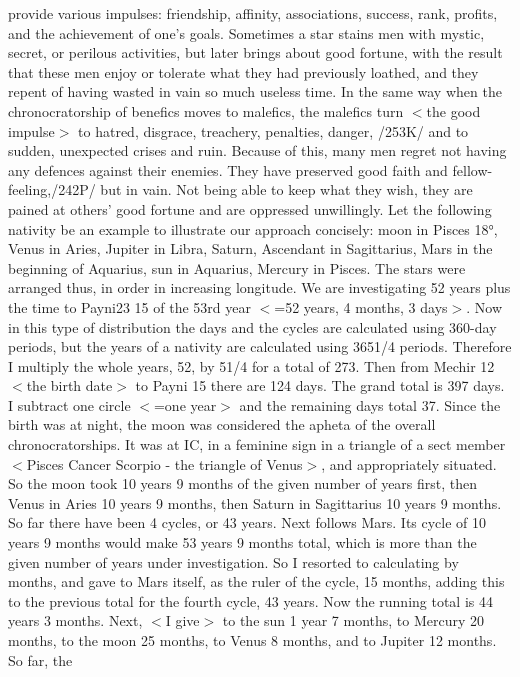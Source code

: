 provide various impulses: friendship, affinity, associations, success, rank, profits, and the achievement of
one’s goals. Sometimes a star stains men with mystic, secret, or perilous activities, but later brings about
good fortune, with the result that these men enjoy or tolerate what they had previously loathed, and they
repent of having wasted in vain so much useless time. In the same way when the chronocratorship of
benefics moves to malefics, the malefics turn $<$the good impulse$>$ to hatred, disgrace, treachery, penalties,
danger, /253K/ and to sudden, unexpected crises and ruin. Because of this, many men regret not having
any defences against their enemies. They have preserved good faith and fellow-feeling,/242P/ but in vain.
Not being able to keep what they wish, they are pained at others’ good fortune and are oppressed
unwillingly.
Let the following nativity be an example to illustrate our approach concisely: moon in Pisces 18°,
Venus in Aries, Jupiter in Libra, Saturn, Ascendant in Sagittarius, Mars in the beginning of Aquarius, sun
in Aquarius, Mercury in Pisces. The stars were arranged thus, in order in increasing longitude. We are
investigating 52 years plus the time to Payni23 15 of the 53rd year $<$=52 years, 4 months, 3 days$>$. Now
in this type of distribution the days and the cycles are calculated using 360-day periods, but the years of a
nativity are calculated using 3651/4 periods. Therefore I multiply the whole years, 52, by 51/4 for a total
of 273. Then from Mechir 12 $<$the birth date$>$ to Payni 15 there are 124 days. The grand total is 397
days. I subtract one circle $<$=one year$>$ and the remaining days total 37. Since the birth was at night, the
moon was considered the apheta of the overall chronocratorships. It was at IC, in a feminine sign in a
triangle of a sect member $<$Pisces Cancer Scorpio - the triangle of Venus$>$, and appropriately situated. So
the moon took 10 years 9 months of the given number of years first, then Venus in Aries 10 years 9
months, then Saturn in Sagittarius 10 years 9 months. So far there have been 4 cycles, or 43 years.
Next follows Mars. Its cycle of 10 years 9 months would make 53 years 9 months total, which is more
than the given number of years under investigation. So I resorted to calculating by months, and gave to
Mars itself, as the ruler of the cycle, 15 months, adding this to the previous total for the fourth cycle, 43
years. Now the running total is 44 years 3 months. Next, $<$I give$>$ to the sun 1 year 7 months, to
Mercury 20 months, to the moon 25 months, to Venus 8 months, and to Jupiter 12 months. So far, the
